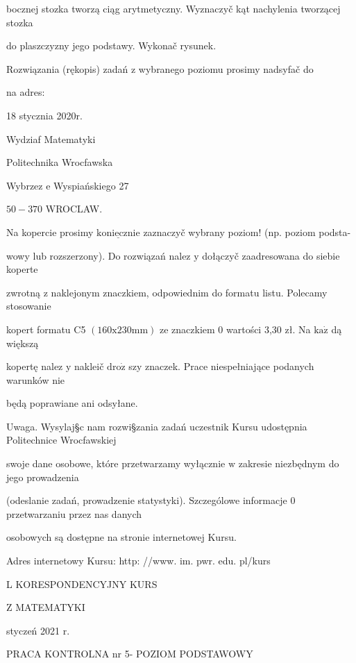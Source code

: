 \documentclass[a4paper,12pt]{article}
\begin{document}
bocznej stozka tworzą ciąg arytmetyczny. Wyznaczyč kąt nachylenia tworzącej stozka

do plaszczyzny jego podstawy. Wykonač rysunek.

Rozwiązania (rękopis) zadań z wybranego poziomu prosimy nadsyfač do

na adres:

18 stycznia 2020r.

Wydziaf Matematyki

Politechnika Wrocfawska

Wybrzez $\mathrm{e}$ Wyspiańskiego 27

$50-370$ WROCLAW.

Na kopercie prosimy $\underline{\mathrm{k}\mathrm{o}\mathrm{n}\mathrm{i}\mathrm{e}\mathrm{c}\mathrm{z}\mathrm{n}\mathrm{i}\mathrm{e}}$ zaznaczyč wybrany poziom! (np. poziom podsta-

wowy lub rozszerzony). Do rozwiązań nalez $\mathrm{y}$ dołączyč zaadresowana do siebie koperte

zwrotną $\mathrm{z}$ naklejonym znaczkiem, odpowiednim do formatu listu. Polecamy stosowanie

kopert formatu C5 $(160\mathrm{x}230\mathrm{m}\mathrm{m})$ ze znaczkiem $0$ wartości 3,30 zł. Na $\mathrm{k}\mathrm{a}\dot{\mathrm{z}}$ dą większą

kopertę nalez $\mathrm{y}$ nakleič $\mathrm{d}\mathrm{r}\mathrm{o}\dot{\mathrm{z}}$ szy znaczek. Prace niespełniające podanych warunków nie

będą poprawiane ani odsyłane.

Uwaga. Wysylaj\S c nam rozwi\S zania zadań uczestnik Kursu udostępnia Politechnice Wrocfawskiej

swoje dane osobowe, które przetwarzamy wyłącznie $\mathrm{w}$ zakresie niezbędnym do jego prowadzenia

(odeslanie zadań, prowadzenie statystyki). Szczególowe informacje $0$ przetwarzaniu przez nas danych

osobowych są dostępne na stronie internetowej Kursu.

Adres internetowy Kursu: http: //www. im. pwr. edu. pl/kurs







L KORESPONDENCYJNY KURS

Z MATEMATYKI

styczeń 2021 r.

PRACA KONTROLNA nr 5- POZIOM PODSTAWOWY
\end{document}
